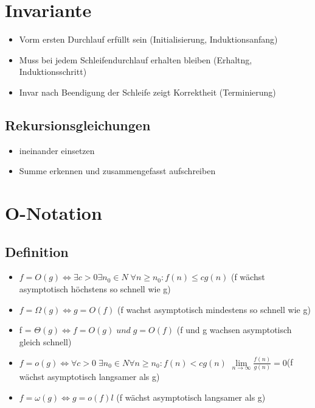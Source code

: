 \documentclass{article}
\begin{document}
\section{Invariante}
\begin{itemize}
\item Vorm ersten Durchlauf erfüllt sein (Initialisierung, Induktionsanfang)
\item Muss bei jedem Schleifendurchlauf erhalten bleiben (Erhaltng, Induktionsschritt)
\item Invar nach Beendigung der Schleife zeigt Korrektheit (Terminierung)
\end{itemize}


\subsection{Rekursionsgleichungen}
\begin{itemize}
\item ineinander einsetzen
\item Summe erkennen und zusammengefasst aufschreiben
\end{itemize}

\section{ O-Notation}
\subsection{Definition}
\begin{itemize}
\item $f = O(g) \Leftrightarrow  \exists  c> 0 \exists n_0 \in N \; \forall n \geq n_0 : f(n) \leq c g(n)$ \newline (f wächst asymptotisch höchstens so schnell wie g)
\item $f = \Omega(g) \Leftrightarrow g = O(f)$ \newline (f wachst asymptotisch mindestens so schnell wie g)

\item f = $\Theta (g) \Leftrightarrow f = O(g) \; und \; g = O(f)$ \newline
(f und g wachsen asymptotisch gleich schnell)
\item $f = o(g) \Leftrightarrow \forall c > 0 \; \exists n_0 \in N \forall n\geq n_0 : f(n) < c g(n)$ \newline 
$ \lim\limits_{n \to \infty}\frac{f(n)}{g(n)} = 0 $\newline (f wächst asymptotisch langsamer als g)
\item $f = \omega(g) \Leftrightarrow g = o(f)l$ \newline (f wächst asymptotisch langsamer als g)
\end{itemize}
\end{document}
